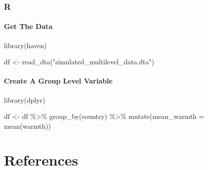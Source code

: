 \documentclass[
  letterpaper,
  DIV=11,
  numbers=noendperiod]{scrreprt}
\newenvironment{Shaded}{\begin{snugshade}}{\end{snugshade}}
\newcommand{\AttributeTok}[1]{\textcolor[rgb]{0.40,0.45,0.13}{#1}}
\newcommand{\FunctionTok}[1]{\textcolor[rgb]{0.28,0.35,0.67}{#1}}
\newcommand{\NormalTok}[1]{\textcolor[rgb]{0.00,0.23,0.31}{#1}}
\newcommand{\OtherTok}[1]{\textcolor[rgb]{0.00,0.23,0.31}{#1}}
\newcommand{\SpecialCharTok}[1]{\textcolor[rgb]{0.37,0.37,0.37}{#1}}
\newcommand{\StringTok}[1]{\textcolor[rgb]{0.13,0.47,0.30}{#1}}
\begin{document}
\subsection{R}

\subsubsection{Get The Data}\label{get-the-data-9}

\begin{Shaded}
\begin{Highlighting}[]
\FunctionTok{library}\NormalTok{(haven)}

\NormalTok{df }\OtherTok{\textless{}{-}} \FunctionTok{read\_dta}\NormalTok{(}\StringTok{"simulated\_multilevel\_data.dta"}\NormalTok{)}
\end{Highlighting}
\end{Shaded}

\subsubsection{Create A Group Level
Variable}\label{create-a-group-level-variable-1}

\begin{Shaded}
\begin{Highlighting}[]
\FunctionTok{library}\NormalTok{(dplyr) }

\NormalTok{df }\OtherTok{\textless{}{-}}\NormalTok{ df }\SpecialCharTok{\%\textgreater{}\%} 
  \FunctionTok{group\_by}\NormalTok{(country) }\SpecialCharTok{\%\textgreater{}\%}
  \FunctionTok{mutate}\NormalTok{(}\AttributeTok{mean\_warmth =} \FunctionTok{mean}\NormalTok{(warmth))}
\end{Highlighting}
\end{Shaded}


\chapter*{References}\label{references}

\end{document}
